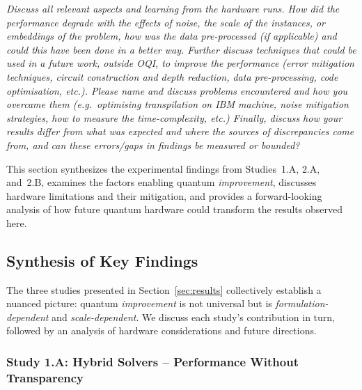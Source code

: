\documentclass{oqireport}
\begin{document}
\textit{
Discuss all relevant aspects and learning from the hardware runs. How did the performance degrade with the effects of noise, the scale of the instances, or embeddings of the problem, how was the data pre-processed (if applicable) and could this have been done in a better way. Further discuss techniques that could be used in a future work, outside OQI, to improve the performance (error mitigation techniques, circuit construction and depth reduction, data pre-processing, code optimisation, etc.).
Please name and discuss  problems encountered and how you overcame them (e.g.\ optimising transpilation on IBM machine, noise mitigation strategies, how to measure the time-complexity, etc.) Finally, discuss how your results differ from what was expected and where the sources of discrepancies come from, and can these errors/gaps in findings be measured or bounded?  
}



This section synthesizes the experimental findings from Studies~1.A, 2.A, and~2.B, examines the factors enabling quantum \textit{improvement}, discusses hardware limitations and their mitigation, and provides a forward-looking analysis of how future quantum hardware could transform the results observed here.

\subsection{Synthesis of Key Findings}

The three studies presented in Section~\ref{sec:results} collectively establish a nuanced picture: quantum \textit{improvement} is not universal but is \textit{formulation-dependent} and \textit{scale-dependent}. We discuss each study's contribution in turn, followed by an analysis of hardware considerations and future directions.


\subsubsection{Study 1.A: Hybrid Solvers -- Performance Without Transparency}
\end{document}
